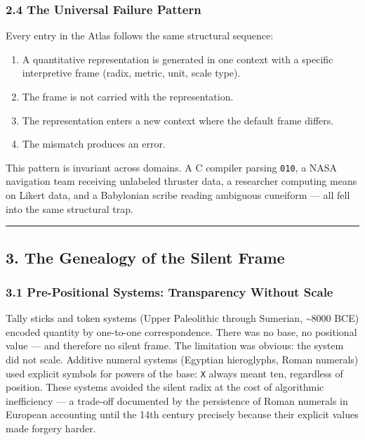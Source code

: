 \documentclass[
]{article}
\providecommand{\tightlist}{%
  \setlength{\itemsep}{0pt}\setlength{\parskip}{0pt}}
\begin{document}
\subsubsection{2.4 The Universal Failure
Pattern}\label{the-universal-failure-pattern}

Every entry in the Atlas follows the same structural sequence:

\begin{enumerate}
\def\labelenumi{\arabic{enumi}.}
\tightlist
\item
  A quantitative representation is generated in one context with a
  specific interpretive frame (radix, metric, unit, scale type).
\item
  The frame is not carried with the representation.
\item
  The representation enters a new context where the default frame
  differs.
\item
  The mismatch produces an error.
\end{enumerate}

This pattern is invariant across domains. A C compiler parsing
\texttt{010}, a NASA navigation team receiving unlabeled thruster data,
a researcher computing means on Likert data, and a Babylonian scribe
reading ambiguous cuneiform --- all fell into the same structural trap.

\begin{center}\rule{0.5\linewidth}{0.5pt}\end{center}

\subsection{3. The Genealogy of the Silent
Frame}\label{the-genealogy-of-the-silent-frame}

\subsubsection{3.1 Pre-Positional Systems: Transparency Without
Scale}\label{pre-positional-systems-transparency-without-scale}

Tally sticks and token systems (Upper Paleolithic through Sumerian,
\textasciitilde8000 BCE) encoded quantity by one-to-one correspondence.
There was no base, no positional value --- and therefore no silent
frame. The limitation was obvious: the system did not scale. Additive
numeral systems (Egyptian hieroglyphs, Roman numerals) used explicit
symbols for powers of the base: \texttt{X} always meant ten, regardless
of position. These systems avoided the silent radix at the cost of
algorithmic inefficiency --- a trade-off documented by the persistence
of Roman numerals in European accounting until the 14th century
precisely because their explicit values made forgery harder.
\end{document}
